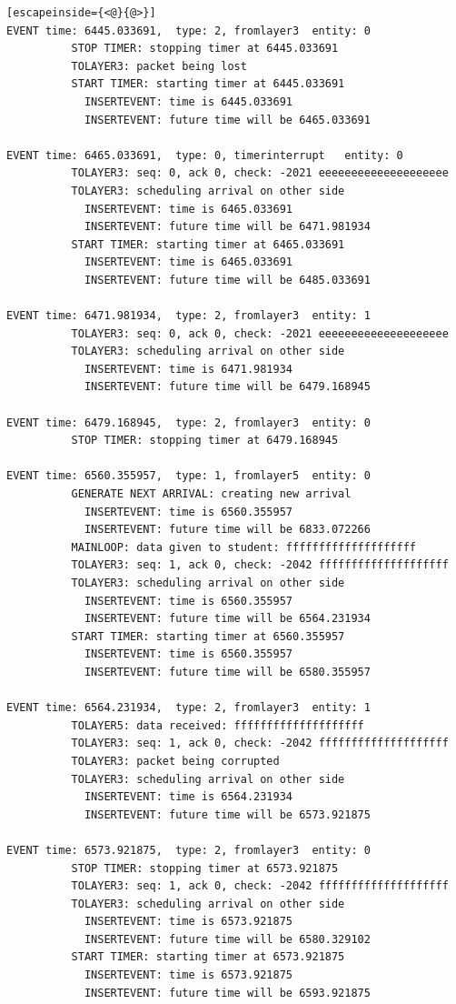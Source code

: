 \documentclass[paper=a4, fontsize=11pt]{scrartcl}
\numberwithin{equation}{section}		%
\numberwithin{figure}{section}			%
\numberwithin{table}{section}				%
\begin{document}
\begin{lstlisting}[escapeinside={<@}{@>}]
EVENT time: 6445.033691,  type: 2, fromlayer3  entity: 0
          STOP TIMER: stopping timer at 6445.033691
          TOLAYER3: packet being lost
          START TIMER: starting timer at 6445.033691
            INSERTEVENT: time is 6445.033691
            INSERTEVENT: future time will be 6465.033691

EVENT time: 6465.033691,  type: 0, timerinterrupt   entity: 0
          TOLAYER3: seq: 0, ack 0, check: -2021 eeeeeeeeeeeeeeeeeeee
          TOLAYER3: scheduling arrival on other side
            INSERTEVENT: time is 6465.033691
            INSERTEVENT: future time will be 6471.981934
          START TIMER: starting timer at 6465.033691
            INSERTEVENT: time is 6465.033691
            INSERTEVENT: future time will be 6485.033691

EVENT time: 6471.981934,  type: 2, fromlayer3  entity: 1
          TOLAYER3: seq: 0, ack 0, check: -2021 eeeeeeeeeeeeeeeeeeee
          TOLAYER3: scheduling arrival on other side
            INSERTEVENT: time is 6471.981934
            INSERTEVENT: future time will be 6479.168945

EVENT time: 6479.168945,  type: 2, fromlayer3  entity: 0
          STOP TIMER: stopping timer at 6479.168945

EVENT time: 6560.355957,  type: 1, fromlayer5  entity: 0
          GENERATE NEXT ARRIVAL: creating new arrival
            INSERTEVENT: time is 6560.355957
            INSERTEVENT: future time will be 6833.072266
          MAINLOOP: data given to student: ffffffffffffffffffff
          TOLAYER3: seq: 1, ack 0, check: -2042 ffffffffffffffffffff
          TOLAYER3: scheduling arrival on other side
            INSERTEVENT: time is 6560.355957
            INSERTEVENT: future time will be 6564.231934
          START TIMER: starting timer at 6560.355957
            INSERTEVENT: time is 6560.355957
            INSERTEVENT: future time will be 6580.355957

EVENT time: 6564.231934,  type: 2, fromlayer3  entity: 1
          TOLAYER5: data received: ffffffffffffffffffff
          TOLAYER3: seq: 1, ack 0, check: -2042 ffffffffffffffffffff
          TOLAYER3: packet being corrupted
          TOLAYER3: scheduling arrival on other side
            INSERTEVENT: time is 6564.231934
            INSERTEVENT: future time will be 6573.921875

EVENT time: 6573.921875,  type: 2, fromlayer3  entity: 0
          STOP TIMER: stopping timer at 6573.921875
          TOLAYER3: seq: 1, ack 0, check: -2042 ffffffffffffffffffff
          TOLAYER3: scheduling arrival on other side
            INSERTEVENT: time is 6573.921875
            INSERTEVENT: future time will be 6580.329102
          START TIMER: starting timer at 6573.921875
            INSERTEVENT: time is 6573.921875
            INSERTEVENT: future time will be 6593.921875


\end{lstlisting}
\end{document}
